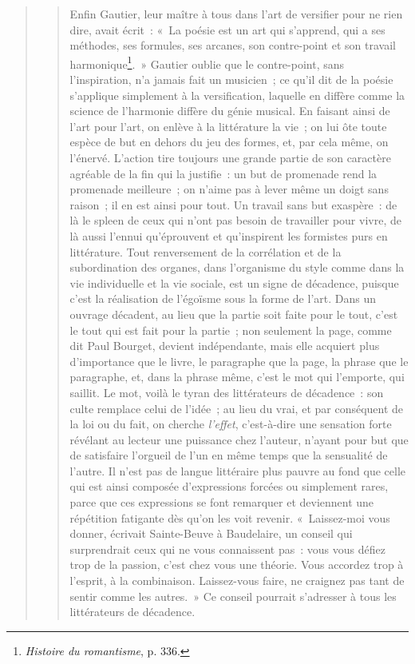 \documentclass[french,twoside]{book} %
\begin{document}
\begin{verse}
\begin{verse}
\noindent Enfin Gautier, leur maître à tous dans l’art de versifier pour ne rien dire, avait écrit : « La poésie est un art qui s’apprend, qui a ses méthodes, ses formules, ses arcanes, son contre-point et son travail harmonique\footnote{\emph{Histoire du romantisme}, p. 336.}. » Gautier oublie que le contre-point, sans l’inspiration, n’a jamais fait un musicien ; ce qu’il dit de la poésie s’applique simplement à la versification, laquelle en diffère comme la science de l’harmonie diffère du génie musical. En faisant ainsi de l’art pour l’art, on enlève à la littérature la vie ; on lui ôte toute espèce de but en dehors du jeu des formes, et, par cela même, on l’énervé. L’action tire toujours une grande partie de son caractère agréable de la fin qui la justifie : un but de promenade rend la promenade meilleure ; on n’aime pas à lever même un doigt sans raison ; il en est ainsi pour tout. Un travail sans but exaspère : de là le spleen de ceux qui n’ont pas besoin de travailler pour vivre, de là aussi l’ennui qu’éprouvent et qu’inspirent les formistes purs en littérature. Tout renversement de la corrélation et de la subordination des organes, dans l’organisme du style comme dans la vie individuelle et la vie sociale, est un signe de décadence, puisque c’est la réalisation de l’égoïsme sous la forme de l’art. Dans un ouvrage décadent, au lieu que la partie soit faite pour le tout, c’est le tout qui est fait pour la partie ; non seulement la page, comme dit Paul Bourget, devient indépendante, mais elle acquiert plus d’importance que le livre, le paragraphe que la page, la phrase que le paragraphe, et, dans la phrase même, c’est le mot qui l’emporte, qui saillit. Le mot, voilà le tyran des littérateurs de décadence : son culte remplace celui de l’idée ; au lieu du vrai, et par conséquent de la loi ou du fait, on cherche \emph{l’effet}, c’est-à-dire une sensation forte révélant au lecteur une puissance chez l’auteur, n’ayant pour but que de satisfaire l’orgueil de l’un en même temps que la sensualité de l’autre. Il n’est pas de langue littéraire plus pauvre au fond que celle qui est ainsi composée d’expressions forcées ou simplement rares, parce que ces expressions se font remarquer et deviennent une répétition fatigante dès qu’on les voit revenir. « Laissez-moi vous donner, écrivait Sainte-Beuve à Baudelaire, un conseil qui surprendrait ceux qui ne vous connaissent pas : vous vous défiez trop de la passion, c’est chez vous une théorie. Vous accordez trop à l’esprit, à la combinaison. Laissez-vous faire, ne craignez pas tant de sentir comme les autres. » Ce conseil pourrait s’adresser à tous les littérateurs de décadence.\par

\end{verse}
\end{verse}
\end{document}

